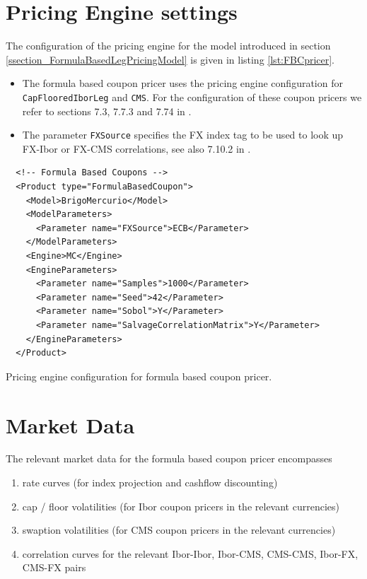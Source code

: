 \documentclass[12pt, a4paper]{article}
\begin{document}
\section{Pricing Engine settings}

The configuration of the pricing engine for the model introduced in section \ref{ssection_FormulaBasedLegPricingModel}
is given in listing \ref{lst:FBCpricer}.

\begin{itemize}
\item The formula based coupon pricer uses the pricing engine configuration for { \tt CapFlooredIborLeg} and {\tt CMS}.
  For the configuration of these coupon pricers we refer to sections 7.3, 7.7.3 and 7.74 in \cite{oreug}.
\item The parameter \verb+FXSource+ specifies the FX index tag to be used to look up FX-Ibor or FX-CMS correlations, see
  also 7.10.2 in \cite{oreug}.
\end{itemize}
%
\begin{listing}
\begin{verbatim}
  <!-- Formula Based Coupons -->
  <Product type="FormulaBasedCoupon">
    <Model>BrigoMercurio</Model>
    <ModelParameters>
      <Parameter name="FXSource">ECB</Parameter>
    </ModelParameters>
    <Engine>MC</Engine>
    <EngineParameters>
      <Parameter name="Samples">1000</Parameter>
      <Parameter name="Seed">42</Parameter>
      <Parameter name="Sobol">Y</Parameter>
      <Parameter name="SalvageCorrelationMatrix">Y</Parameter>
    </EngineParameters>
  </Product>
\end{verbatim}
\caption{Pricing engine configuration for formula based coupon pricer.}
\label{lst:FBCpricer}
\end{listing}
%
\section{Market Data}

The relevant market data for the formula based coupon pricer encompasses

\begin{enumerate}
\item rate curves (for index projection and cashflow discounting)
\item cap / floor volatilities (for Ibor coupon pricers in the relevant currencies)
\item swaption volatilities (for CMS coupon pricers in the relevant currencies)
\item correlation curves for the relevant Ibor-Ibor, Ibor-CMS, CMS-CMS, Ibor-FX, CMS-FX pairs
\end{enumerate}
\end{document}
